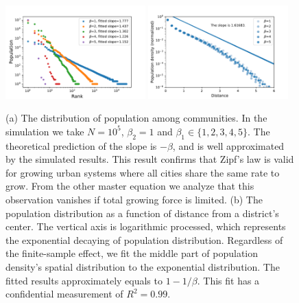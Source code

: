 \documentclass[reprint,unsortedaddress,amsmath,amssymb,aps,prl,showkeys]{revtex4-2}
\begin{document}
\begin{figure}[t]
    \centering
    \includegraphics[width=0.48\textwidth]{pics/zipf.pdf}
    \includegraphics[width=0.48\textwidth]{pics/kernal_density.pdf}
    \caption{(a) The distribution of population among communities. In the simulation we take $N = 10^5$, $\beta_2=1$ and $\beta_1 \in\{1,2,3,4,5\}$. The theoretical prediction of the slope is $-\beta$, and is well approximated by the simulated results. This result confirms that Zipf's law is valid for growing urban systems where all cities share the same rate to grow. From the other master equation we analyze that this observation vanishes if total growing force is limited. (b) The population distribution as a function of distance from a district's center. The vertical axis is logarithmic processed, which represents the exponential decaying of population distribution. Regardless of the finite-sample effect, we fit the middle part of population density's spatial distribution to the exponential distribution. The fitted results approximately equals to $1-1/\beta$. This fit has a confidential measurement of $R^2=0.99$.}
    \label{fig:rankditribution}
    \label{fig:clark}
\end{figure}




\end{document}
